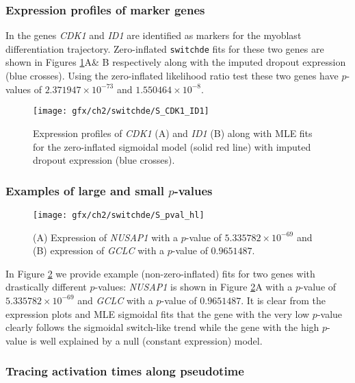 \subsubsection{Expression profiles of marker genes}

In \cite{Trapnell2014-xi} the genes \emph{CDK1} and \emph{ID1} are identified as markers for the myoblast differentiation trajectory. Zero-inflated \texttt{switchde} fits for these two genes are shown in Figures \ref{fig:S1}A\& B respectively along with the imputed dropout expression (blue crosses). Using the zero-inflated likelihood ratio test these two genes have $p$-values of $2.371947 \times 10^{-73}$ and $1.550464 \times 10^{-8}$.

\begin{figure}[h]
\centering
\texttt{[image: gfx/ch2/switchde/S\_CDK1\_ID1]}
\caption{Expression profiles of \emph{CDK1} (A) and \emph{ID1} (B) along with MLE fits for the zero-inflated sigmoidal model (solid red line) with imputed dropout expression (blue crosses).}\label{fig:S1}
\end{figure}

\subsubsection{Examples of large and small $p$-values}

\begin{figure}[h]%
\centering
\texttt{[image: gfx/ch2/switchde/S\_pval\_hl]}
\caption{(A) Expression of \emph{NUSAP1} with a $p$-value of $5.335782 \times 10^{-69}$ and (B) expression of \emph{GCLC} with a $p$-value of $0.9651487$.}\label{fig:S2}
\end{figure}

In Figure \ref{fig:S2} we provide example (non-zero-inflated) fits for two genes with drastically different $p$-values: \emph{NUSAP1} is shown in Figure \ref{fig:S2}A with a $p$-value of $5.335782 \times 10^{-69}$ and \emph{GCLC} with a $p$-value of $0.9651487$. It is clear from the expression plots and MLE sigmoidal fits that the gene with the very low $p$-value clearly follows the sigmoidal switch-like trend while the gene with the high $p$-value is well explained by a null (constant expression) model.

\subsubsection{Tracing activation times along pseudotime}



